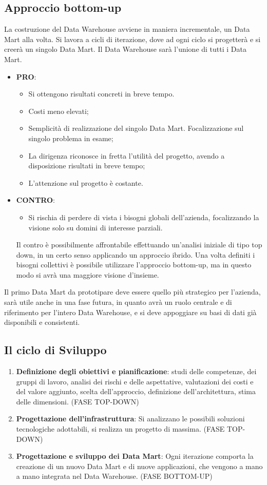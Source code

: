 \subsection{Approccio bottom-up}
La costruzione del Data Warehouse avviene in maniera incrementale, un Data Mart alla volta. Si lavora a cicli di iterazione, dove ad ogni ciclo si progetterà e si creerà un singolo Data Mart. Il Data Warehouse sarà l'unione di tutti i Data Mart.
\begin{itemize}
	\item \textbf{PRO}:
	\begin{itemize}
		\item Si ottengono risultati concreti in breve tempo.
		\item Costi meno elevati;
		\item Semplicità di realizzazione del singolo Data Mart. Focalizzazione sul singolo problema in esame;
		\item La dirigenza riconosce in fretta l'utilità del progetto, avendo a disposizione risultati in breve tempo;
		\item L'attenzione sul progetto è costante.
	\end{itemize}
	\item \textbf{CONTRO}:
	\begin{itemize}
		\item Si rischia di perdere di vista i bisogni globali dell'azienda, focalizzando la visione solo su domini di interesse parziali.
	\end{itemize}
	Il contro è possibilmente affrontabile effettuando un'analisi iniziale di tipo top down, in un certo senso applicando un approccio ibrido. Una volta definiti i bisogni collettivi è possibile utilizzare l'approccio bottom-up, ma in questo modo si avrà una maggiore visione d'insieme.
\end{itemize}

\noindent Il primo Data Mart da prototipare deve essere quello più strategico per l'azienda, sarà utile anche in una fase futura, in quanto avrà un ruolo centrale e di riferimento per l'intero Data Warehouse, e si deve appoggiare su basi di dati già disponibili e consistenti.

\subsection{Il ciclo di Sviluppo}

\begin{enumerate}
	\item \textbf{Definizione degli obiettivi e pianificazione}: studi delle competenze, dei gruppi di lavoro, analisi dei rischi e delle aspettative, valutazioni dei costi e del valore aggiunto, scelta dell'approccio, definizione dell'architettura, stima delle dimensioni. (FASE TOP-DOWN)
	\item \textbf{Progettazione dell'infrastruttura}: Si analizzano le possibili soluzioni tecnologiche adottabili, si realizza un progetto di massima. (FASE TOP-DOWN)
	\item \textbf{Progettazione e sviluppo dei Data Mart}: Ogni iterazione comporta la creazione di un nuovo Data Mart e di nuove applicazioni, che vengono a mano a mano integrata nel Data Warehouse. (FASE BOTTOM-UP)
\end{enumerate}
